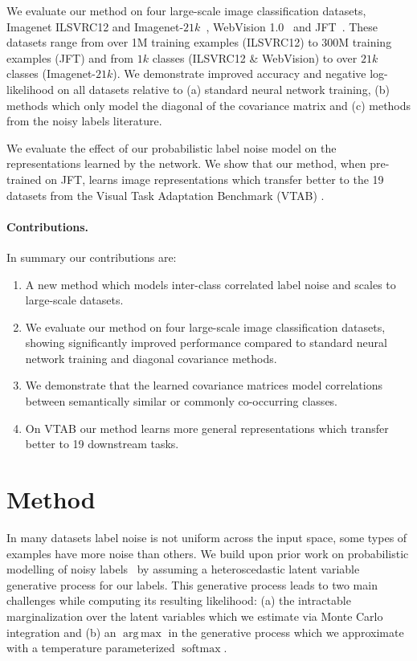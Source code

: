 \documentclass[final]{cvpr}
\DeclareMathOperator*{\argmax}{arg\,max}
\DeclareMathOperator*{\softmax}{softmax}
\begin{document}
We evaluate our method on four large-scale image classification datasets, Imagenet ILSVRC12 and Imagenet-$21k$~\cite{deng2009imagenet}, WebVision 1.0~\cite{li2017webvision} and JFT~\cite{distillation2015}. These datasets range from over 1M training examples (ILSVRC12) to 300M training examples (JFT) and from $1k$ classes (ILSVRC12 \& WebVision) to over $21k$ classes (Imagenet-$21k$). We demonstrate improved accuracy and negative log-likelihood on all datasets relative to (a) standard neural network training, (b) methods which only model the diagonal of the covariance matrix and (c) methods from the noisy labels literature.

We evaluate the effect of our probabilistic label noise model on the representations learned by the network. We show that our method, when pre-trained on JFT, learns image representations which transfer better to the 19 datasets from the Visual Task Adaptation Benchmark (VTAB) \cite{zhai2020largescale}.

\paragraph{Contributions.} In summary our contributions are:
\begin{enumerate}
    \itemsep0em 
    \item A new method which models inter-class correlated label noise and scales to large-scale datasets.
    \item We evaluate our method on four large-scale image classification datasets, showing significantly improved performance compared to standard neural network training and diagonal covariance methods.
\item We demonstrate that the learned covariance matrices model correlations between semantically similar or commonly co-occurring classes.
\item On VTAB our method learns more general representations which transfer better to 19 downstream tasks.
\end{enumerate}

\section{Method}
\label{sec:method}

In many datasets label noise is not uniform across the input space, some types of examples have more noise than others. We build upon prior work on probabilistic modelling of noisy labels~\cite{kendall2017uncertainties,collier2020analysis} by assuming a heteroscedastic latent variable generative process for our labels. This generative process leads to two main challenges while computing its resulting likelihood: (a) the intractable marginalization over the latent variables which we estimate via Monte Carlo integration and (b) an $\argmax$ in the generative process which we approximate with a temperature parameterized $\softmax$.
\end{document}
